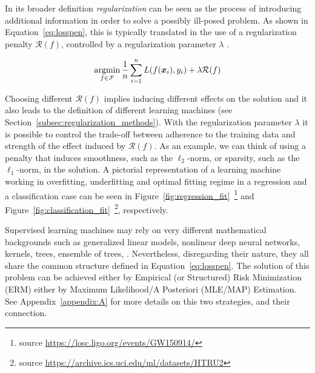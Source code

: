 	    In its broader definition \textit{regularization} can be seen as the process of introducing additional information in order to solve a possibly ill-posed problem.
			As shown in Equation~\eqref{eq:losspen}, this is typically translated in the use of a regularization penalty $\mathcal{R}(f)$, controlled by a regularization parameter $\lambda$ \cite{tikhonov1963solution, evgeniou2000regularization}.

	     \begin{equation}\label{eq:losspen}
	    	\mathop{\mathrm{argmin}}\limits_{f \in \mathcal{F}} \frac{1}{n}\sum_{i=1}^n L(f(\bm{x}_i),y_i) + \lambda \mathcal{R}(f)
	    \end{equation}

			Choosing different $\mathcal{R}(f)$ implies inducing different effects on the solution and it also leads to the definition of different learning machines (see Section~\ref{subsec:regularization_methods}).
			With the regularization parameter $\lambda$ it is possible to control the trade-off between adherence to the training data and strength of the effect induced by $\mathcal{R}(f)$.
			As an example, we can think of using a penalty that induces smoothness, such as the $\ell_2$-norm, or sparsity, such as the $\ell_1$-norm, in the solution.
			A pictorial representation of a learning machine working in overfitting, underfitting and optimal fitting regime in a regression and a classification case can be seen in
			Figure~\ref{fig:regression_fit}~\footnote{source \url{https://losc.ligo.org/events/GW150914/}}
			and
		  Figure~\ref{fig:classification_fit}~\footnote{source \url{https://archive.ics.uci.edu/ml/datasets/HTRU2}}, respectively.



	    Supervised learning machines may rely on very different mathematical backgrounds such as generalized linear models, nonlinear deep neural networks, kernels, trees, ensemble of trees, \etc. Nevertheless, disregarding their nature, they all share the common structure defined in Equation~\eqref{eq:losspen}.
	    The solution of this problem can be achieved either by Empirical (or Structured) Risk Minimization (\ac{ERM}) either by Maximum Likelihood/A Posteriori (\ac{MLE}/\ac{MAP}) Estimation. See Appendix~\ref{appendix:A} for more details on this two strategies, and their connection.

